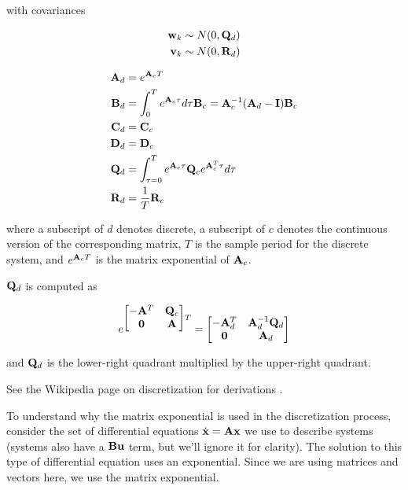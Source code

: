 with covariances

\begin{align*}
  \mathbf{w}_k &\sim N(0, \mathbf{Q}_d) \\
  \mathbf{v}_k &\sim N(0, \mathbf{R}_d)
\end{align*}

\begin{theorem}
  \begin{align}
    \mathbf{A}_d &= e^{\mathbf{A}_c T} \\
    \mathbf{B}_d &= \int_0^T e^{\mathbf{A}_c \tau} d\tau \mathbf{B}_c =
      \mathbf{A}_c^{-1} (\mathbf{A}_d - \mathbf{I}) \mathbf{B}_c \\
    \mathbf{C}_d &= \mathbf{C}_c \\
    \mathbf{D}_d &= \mathbf{D}_c \\
    \mathbf{Q}_d &= \int_{\tau = 0}^{T} e^{\mathbf{A}_c\tau} \mathbf{Q}_c
      e^{\mathbf{A}_c^T\tau} d\tau \\
    \mathbf{R}_d &= \frac{1}{T} \mathbf{R}_c
  \end{align}

  where a subscript of $d$ denotes discrete, a subscript of $c$ denotes the
  continuous version of the corresponding matrix, $T$ is the sample period for
  the discrete system, and $e^{\mathbf{A}_c T}$ is the matrix exponential of
  $\mathbf{A}_c$.
\end{theorem}

$\mathbf{Q}_d$ is computed as

\begin{equation*}
  e^{
  \begin{bmatrix}
    -\mathbf{A}^T & \mathbf{Q}_c \\
    \mathbf{0} & \mathbf{A}
  \end{bmatrix}T} =
  \begin{bmatrix}
    -\mathbf{A}_d^T & \mathbf{A}_d^{-1} \mathbf{Q}_d \\
    \mathbf{0} & \mathbf{A}_d
  \end{bmatrix}
\end{equation*}

and $\mathbf{Q}_d$ is the lower-right quadrant multiplied by the upper-right
quadrant.

See the Wikipedia page on discretization for derivations
\cite{bib:discretization}.

To understand why the matrix exponential is used in the discretization process,
consider the set of differential equations $\dot{\mathbf{x}} = \mathbf{A}\mathbf{x}$ we
use to describe systems (systems also have a $\mathbf{B}\mathbf{u}$ term, but we'll
ignore it for clarity). The solution to this type of differential equation uses
an exponential. Since we are using matrices and vectors here, we use the matrix
exponential.


